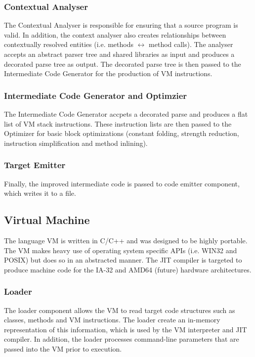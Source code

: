 \documentclass[12pt]{article}
\begin{document}
\subsubsection{Contextual Analyser}
The Contextual Analyser is responsible for ensuring that a source program is valid.  In addition, the context analyser also creates relationships between contextually resolved entities (i.e. methods $\longleftrightarrow$ method calls).  The analyser accepts an abstract parser tree and shared libraries as input and produces a decorated parse tree as output.  The decorated parse tree is then passed to the Intermediate Code Generator for the production of VM instructions.

\subsubsection{Intermediate Code Generator and Optimzier}
The Intermediate Code Generator accpets a decorated parse and produces a flat list of VM stack instructions.  These instruction lists are then passed to the Optimizer for basic block optimizations (constant folding, strength reduction, instruction simplification and method inlining).

\subsubsection{Target Emitter}
Finally, the improved intermediate code is passed to code emitter component, which writes it to a file.

\subsection{Virtual Machine}
The language VM is written in C/C++ and was designed to be highly portable.  The VM makes heavy use of operating system specific APIs (i.e. WIN32 and POSIX) but does so in an abstracted manner.  The JIT compiler is targeted to produce machine code for the IA-32 and AMD64 (future) hardware architectures.  

\subsubsection{Loader}
The loader component allows the VM to read target code structures such as classes, methods and VM instructions.  The loader create an in-memory representation of this information, which is used by the VM interpreter and JIT compiler.  In addition, the loader processes command-line parameters that are passed into the VM prior to execution.
\end{document}
